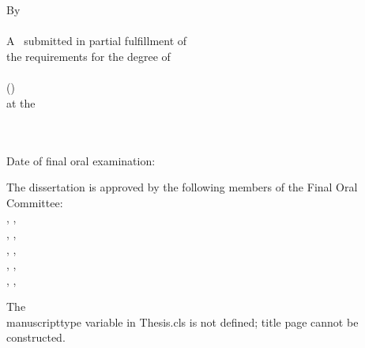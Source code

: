 \documentclass[12pt,letterpaper,oneside]{Thesis}
\begin{document}
\begin{titlepage}
\begin{center}
\ \\
{\ttitle}\\[0.7in]
By \\
\authornames \\[0.7in]
A \MakeLowercase{\manuscripttype}\ submitted in partial fulfillment of \\ the requirements for the degree of\\[0.7in]
\degreename \\
(\subjectname) \\[0.7in]
 at the\\
\MakeUppercase{\univname}\\
\graduationyear\\[0.7in]
\end{center}

Date of final oral examination: 

\begin{spacing}{1}
\hangindent=0.5in
The dissertation is approved by the following members of the Final Oral Committee:\\
\committeenameone, \committeetitleone, \committeedeptone \\
\committeenametwo, \committeetitletwo, \committeedepttwo \\
\committeenamethree, \committeetitlethree, \committeedeptthree \\
\committeenamefour, \committeetitlefour, \committeedeptfour \\
\committeenamefive, \committeetitlefive, \committeedeptfive
\end{spacing}

\end{titlepage}

\else

\begin{titlepage}
The \\manuscripttype variable in Thesis.cls is not defined; title page cannot be constructed.
\end{titlepage}

\fi\fi


\Declaration{}
\end{document}

